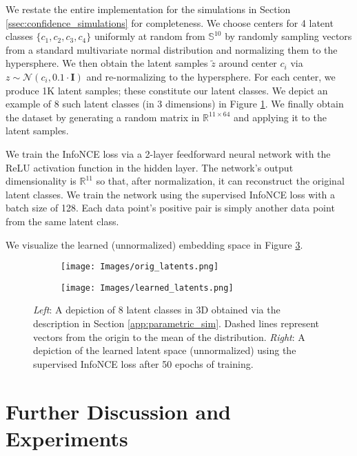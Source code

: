 We restate the entire implementation for the simulations in Section \ref{ssec:confidence_simulations} for completeness. We choose centers for 4 latent classes $\{c_1, c_2, c_3, c_4\}$ uniformly at random from $\mathbb{S}^{10}$ by randomly sampling vectors from a standard multivariate normal distribution and normalizing them to the hypersphere. We then obtain the latent samples $\tilde{z}$ around center $c_i$ via $z \sim \mathcal{N}(c_i, 0.1 \cdot \mathbf{I})$ and re-normalizing to the hypersphere. For each center, we produce 1K latent samples; these constitute our latent classes. We depict an example of 8 such latent classes (in 3 dimensions) in Figure \ref{fig:orig_latents}. We finally obtain the dataset by generating a random matrix in $\mathbb{R}^{11 \times 64}$ and applying it to the latent samples.

We train the InfoNCE loss via a 2-layer feedforward neural network with the ReLU activation function in the hidden layer. The network's output dimensionality is $\mathbb{R}^{11}$ so that, after normalization, it can reconstruct the original latent classes. We train the network using the supervised InfoNCE loss with a batch size of 128. Each data point's positive pair is simply another data point from the same latent class.

We visualize the learned (unnormalized) embedding space in Figure \ref{fig:learned_latents}.

\begin{figure}
    \centering
    \begin{subfigure}{0.4\linewidth}
    \texttt{[image: Images/orig\_latents.png]}
    \caption{}
    \label{fig:orig_latents}
    \end{subfigure}
    \quad\quad
    \begin{subfigure}{0.4\linewidth}
    \texttt{[image: Images/learned\_latents.png]}
    \caption{}
    \label{fig:learned_latents}
    \end{subfigure}
    \caption{\emph{Left}: A depiction of $8$ latent classes in $3$D obtained via the description in Section \ref{app:parametric_sim}. Dashed lines represent vectors from the origin to the mean of the distribution. \emph{Right}: A depiction of the learned latent space (unnormalized) using the supervised InfoNCE loss after 50 epochs of training.}
    
\end{figure}


\section{Further Discussion and Experiments}
\label{app:experiments}

